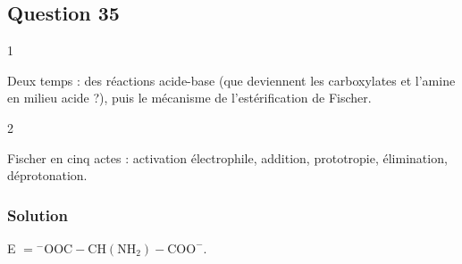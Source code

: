 \documentclass[11pt,a4paper]{article}
\begin{document}
\hypertarget{question-35}{%
\subsection{Question 35}\label{question-35}}

\begin{indication}{1}

Deux temps : des réactions acide-base (que deviennent les carboxylates et l'amine en milieu acide ?), puis le mécanisme de l'estérification de Fischer.

\end{indication}

\begin{indication}{2}

Fischer en cinq actes : activation électrophile, addition, prototropie, élimination, déprotonation.

\end{indication}

\hypertarget{solution-34}{%
\subsubsection{Solution}\label{solution-34}}

E \(=\mathrm{^-OOC{-}CH(NH_2){-}COO^-}\).
\end{document}
